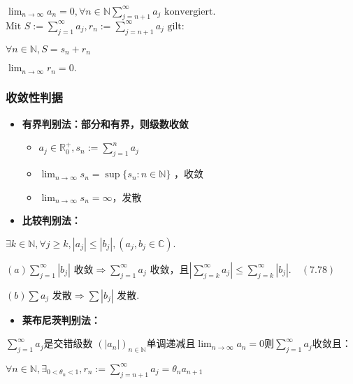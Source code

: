 \documentclass[a4paper,12pt]{article}
\providecommand{\tightlist}{\setlength{\itemsep}{0pt}\setlength{\parskip}{0pt}}
\begin{document}
\(\lim_{n \to \infty} a_n = 0, \forall n \in \mathbb{N} \sum_{j=n+1}^{\infty} a_j \text{ konvergiert.}\)\\
\(\text{Mit } S := \sum_{j=1}^{\infty} a_j, r_n := \sum_{j=n+1}^{\infty} a_j \text{ gilt:}\)

\(\forall n \in \mathbb{N} , S = s_n + r_n\)

\(\lim_{n \to \infty} r_n = 0.\)

\subsubsection{收敛性判据}\label{ux6536ux655bux6027ux5224ux636e}

\begin{itemize}
\item
  \textbf{有界判别法：部分和有界，则级数收敛}

  \begin{itemize}
  \tightlist
  \item
    \(a_j \in \mathbb{R}^+_0, s_n := \sum_{j=1}^{n} a_j\)\\
  \item
    \(\lim_{n \to \infty} s_n = \sup\{s_n : n \in \mathbb{N}\}\) ，收敛
  \item
    \(\lim_{n \to \infty} s_n = \infty\)，发散
  \end{itemize}
\item
  \textbf{比较判别法：}
\end{itemize}

\(\exists k \in \mathbb{N} , \forall j \geq k , |a_j| \leq |b_j|, (a_j, b_j \in \mathbb{C}).\)

\((a) \sum_{j=1}^{\infty} |b_j| \text{ 收敛} \Rightarrow \sum_{j=1}^{\infty} a_j \text{ 收敛，且} \left|\sum_{j=k}^{\infty} a_j\right| \leq \sum_{j=k}^{\infty} |b_j|. \quad (7.78)\)

\((b) \sum a_j \text{ 发散} \Rightarrow \sum |b_j| \text{ 发散}.\)

\begin{itemize}
\tightlist
\item
  \textbf{莱布尼茨判别法：}
\end{itemize}

\(\sum_{j=1}^{\infty} a_j \text{是交错级数 }(|a_n|)_{n \in \mathbb{N}} \text{单调递减且} \lim_{n \to \infty} a_n = 0 \text{则} \sum_{j=1}^{\infty} a_j \text{收敛且}\)：

\(\forall n \in \mathbb{N} , \exists_{0 < \theta_n < 1} , r_n := \sum_{j=n+1}^{\infty} a_j = \theta_n a_{n+1}\)
\end{document}
